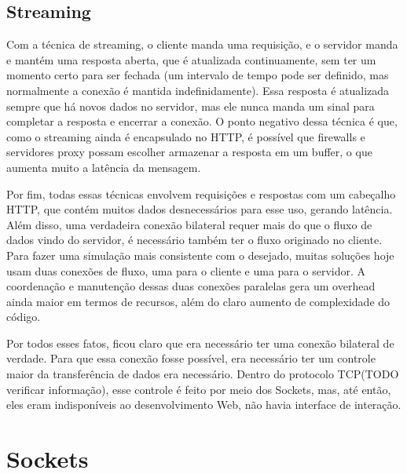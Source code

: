 \documentclass[a4paper,12pt]{article}
\begin{document}


\subsection{Streaming}

Com a técnica de streaming, o cliente manda uma requisição, e o servidor manda e mantém uma resposta aberta, que é atualizada continuamente, sem ter um momento certo para ser fechada (um intervalo de tempo pode ser definido, mas normalmente a conexão é mantida indefinidamente). Essa resposta é atualizada sempre que há novos dados no servidor, mas ele nunca manda um sinal para completar a resposta e encerrar a conexão. O ponto negativo dessa técnica é que, como o streaming ainda é encapsulado no HTTP, é possível que firewalls e servidores proxy possam escolher armazenar a resposta em um buffer, o que aumenta muito a latência da mensagem.


Por fim, todas essas técnicas envolvem requisições e respostas com um cabeçalho HTTP, que contém muitos dados desnecessários para esse uso, gerando latência. Além disso, uma verdadeira conexão bilateral requer mais do que o fluxo de dados vindo do servidor, é necessário também ter o fluxo originado no cliente. Para fazer uma simulação mais consistente com o desejado, muitas soluções hoje usam duas conexões de fluxo, uma para o cliente e uma para o servidor. A coordenação e manutenção dessas duas conexões paralelas gera um overhead ainda maior em termos de recursos, além do claro aumento de complexidade do código.

Por todos esses fatos, ficou claro que era necessário ter uma conexão bilateral de verdade. Para que essa conexão fosse possível, era necessário ter um controle maior da transferência de dados era necessário. Dentro do protocolo TCP(TODO verificar informação), esse controle é feito por meio dos Sockets, mas, até então, eles eram indisponíveis ao desenvolvimento Web, não havia interface de interação.


\section{Sockets}
\end{document}
